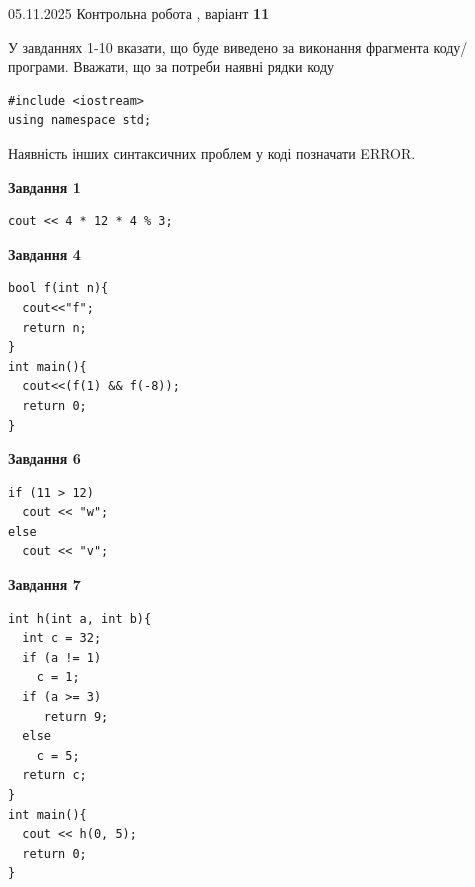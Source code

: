 \documentclass[12pt, ukrainian]{article}
\begin{document}
{\Large{05.11.2025 Контрольна робота , варіант  \No \textbf { 11 }\par}}
{
\begin {large}
У завданнях 1-10 вказати, що буде виведено за виконання фрагмента коду/про\-гра\-ми.
Вважати, що за потреби наявні рядки коду
\begin{verbatim}
#include <iostream>
using namespace std;
\end{verbatim}
Наявність інших синтаксичних проблем у коді позначати ERROR.

\begin{minipage}[t]{7.0cm}

\begin{center}
\textbf{Завдання 1}
\end{center}
\vspace{-8mm}

\begin{verbatim}
cout << 4 * 12 * 4 % 3;
\end{verbatim}



\begin{center}
\textbf{Завдання 4}
\end{center}
\vspace{-8mm}

\begin{verbatim}
bool f(int n){
  cout<<"f";
  return n;
}
int main(){
  cout<<(f(1) && f(-8));
  return 0;
}
\end{verbatim}



\begin{center}
\textbf{Завдання 6}
\end{center}
\vspace{-8mm}

\begin{verbatim}
if (11 > 12)
  cout << "w";
else
  cout << "v";
\end{verbatim}



\begin{center}
\textbf{Завдання 7}
\end{center}
\vspace{-8mm}

\begin{verbatim}
int h(int a, int b){
  int c = 32;
  if (a != 1)
    c = 1;
  if (a >= 3)
     return 9;
  else
    c = 5;
  return c;
}
int main(){
  cout << h(0, 5);
  return 0;
}
\end{verbatim}


\end{minipage}
\end{large}}
\end{document}
